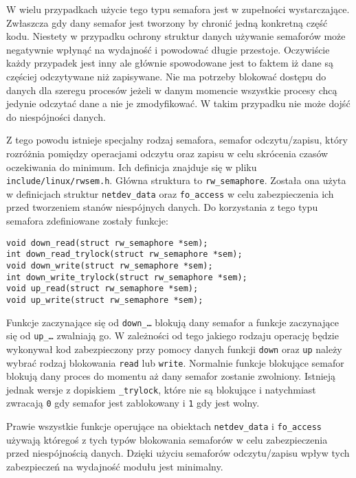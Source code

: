 \documentclass[10pt]{scrartcl}
\begin{document}
W wielu przypadkach użycie tego typu semafora jest w zupełności wystarczające. Zwłaszcza gdy dany semafor jest tworzony by chronić jedną konkretną część kodu. Niestety w przypadku ochrony struktur danych używanie semaforów może negatywnie wpłynąć na wydajność i powodować długie przestoje. Oczywiście każdy przypadek jest inny ale głównie spowodowane jest to faktem iż dane są częściej odczytywane niż zapisywane. Nie ma potrzeby blokować dostępu do danych dla szeregu procesów jeżeli w danym momencie wszystkie procesy chcą jedynie odczytać dane a nie je zmodyfikować. W takim przypadku nie może dojść do niespójności danych.

Z tego powodu istnieje specjalny rodzaj semafora, semafor odczytu/zapisu, który rozróżnia pomiędzy operacjami odczytu oraz zapisu w celu skrócenia czasów oczekiwania do minimum. Ich definicja znajduje się w pliku \texttt{include/linux/rwsem.h}. Główna struktura to \texttt{rw\_semaphore}. Została ona użyta w definicjach struktur \texttt{netdev\_data} oraz \texttt{fo\_access} w celu zabezpieczenia ich przed tworzeniem stanów niespójnych danych. Do korzystania z tego typu semafora zdefiniowane zostały funkcje:

\begin{verbatim}
void down_read(struct rw_semaphore *sem);
int down_read_trylock(struct rw_semaphore *sem);
void down_write(struct rw_semaphore *sem);
int down_write_trylock(struct rw_semaphore *sem);
void up_read(struct rw_semaphore *sem);
void up_write(struct rw_semaphore *sem);
\end{verbatim}

Funkcje zaczynające się od \texttt{down\_\ldots} blokują dany semafor a funkcje zaczynające się od \texttt{up\_\ldots} zwalniają go. W zależności od tego jakiego rodzaju operację będzie wykonywał kod zabezpieczony przy pomocy danych funkcji \texttt{down} oraz \texttt{up} należy wybrać rodzaj blokowania \texttt{read} lub \texttt{write}. Normalnie funkcje blokujące semafor blokują dany proces do momentu aż dany semafor zostanie zwolniony. Istnieją jednak wersje z dopiskiem \texttt{\_trylock}, które nie są blokujące i natychmiast zwracają \texttt{0} gdy semafor jest zablokowany i \texttt{1} gdy jest wolny.

Prawie wszystkie funkcje operujące na obiektach \texttt{netdev\_data} i \texttt{fo\_access} używają któregoś z tych typów blokowania semaforów w celu zabezpieczenia przed niespójnością danych. Dzięki użyciu semaforów odczytu/zapisu wpływ tych zabezpieczeń na wydajność modułu jest minimalny.
\end{document}
